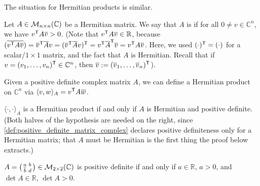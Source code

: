 The situation for Hermitian products is similar.

\begin{definition}
\label{def:positive_definite_matrix_complex}
    Let $A \in \mathcal{M}_{n \times n}(\mathbb{C})$ be a Hermitian matrix. We say that $A$ is  if for all $0 \neq v \in \mathbb{C}^n$, we have $v^{\mathsf{T}} A \overline{v} > 0$.
    (Note that $v^{\mathsf{T}} A \overline{v} \in \mathbb{R}$, because $(\overline{v^{\mathsf{T}} A \overline{v}}) = \overline{v}^{\mathsf{T}} \overline{A} v = (\overline{v}^{\mathsf{T}} \overline{A} v)^{\mathsf{T}} = v^{\mathsf{T}} \overline{A}^{\mathsf{T}} \overline{v} = v^{\mathsf{T}} A \overline{v}$. Here, we used $(\cdot)^{\mathsf{T}} = (\cdot)$ for a scalar/$1\times1$ matrix, and the fact that $A$ is Hermitian. Recall that if $v = (v_1, \dots, v_n)^{\mathsf{T}} \in \mathbb{C}^n$, then $\overline{v} := (\overline{v}_1, \dots, \overline{v}_n)^{\mathsf{T}}$).
\end{definition}

Given a positive definite complex matrix $A$, we can define a Hermitian product on $\mathbb{C}^n$ via $\langle v, w \rangle_A = v^{\mathsf{T}} A \overline{w}$.

\begin{claim*}
\label{claim:hermitian_product_iff_pos_def}
    $\langle \cdot, \cdot \rangle_A$ is a Hermitian product if and only if $A$ is Hermitian and positive definite. (Both halves of the hypothesis are needed on the right, since \cref{def:positive_definite_matrix_complex} declares positive definiteness only for a Hermitian matrix; that $A$ must be Hermitian is the first thing the proof below extracts.)
\end{claim*}

\begin{exercise}\label{exc:pos_def_2x2_complex}
    $A = \left(\begin{smallmatrix} a & b \\ \overline{b} & d \end{smallmatrix}\right) \in \mathcal{M}_{2 \times 2}(\mathbb{C})$ is positive definite if and only if $a \in \mathbb{R}$, $a > 0$, and $\det A \in \mathbb{R}$, $\det A > 0$.
\end{exercise}

